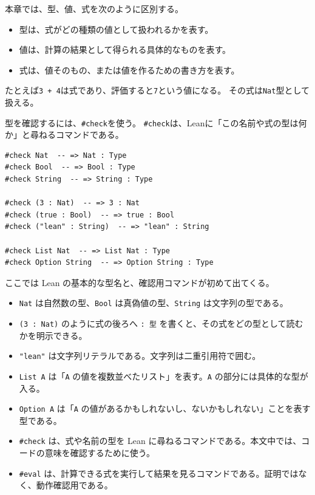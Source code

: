 \begin{definitionbox}
本章では、型、値、式を次のように区別する。

\begin{itemize}
\item 型は、式がどの種類の値として扱われるかを表す。
\item 値は、計算の結果として得られる具体的なものを表す。
\item 式は、値そのもの、または値を作るための書き方を表す。
\end{itemize}

たとえば\texttt{3 + 4}は式であり、評価すると\texttt{7}という値になる。
その式は\texttt{Nat}型として扱える。
\end{definitionbox}

型を確認するには、\texttt{\#check}を使う。
\texttt{\#check}は、Leanに「この名前や式の型は何か」と尋ねるコマンドである。

\begin{listing}[htbp]
\begin{verbatim}
#check Nat  -- => Nat : Type
#check Bool  -- => Bool : Type
#check String  -- => String : Type

#check (3 : Nat)  -- => 3 : Nat
#check (true : Bool)  -- => true : Bool
#check ("lean" : String)  -- => "lean" : String

#check List Nat  -- => List Nat : Type
#check Option String  -- => Option String : Type
\end{verbatim}
\caption{型注釈と型確認}
\label{lst:ch01-type-annotation-check}
\end{listing}

\begin{syntaxbox}
ここでは Lean の基本的な型名と、確認用コマンドが初めて出てくる。
\begin{itemize}
\item \texttt{Nat} は自然数の型、\texttt{Bool} は真偽値の型、\texttt{String} は文字列の型である。
\item \texttt{(3 : Nat)} のように式の後ろへ \texttt{: 型} を書くと、その式をどの型として読むかを明示できる。
\item \texttt{"lean"} は文字列リテラルである。文字列は二重引用符で囲む。
\item \texttt{List A} は「\texttt{A} の値を複数並べたリスト」を表す。\texttt{A} の部分には具体的な型が入る。
\item \texttt{Option A} は「\texttt{A} の値があるかもしれないし、ないかもしれない」ことを表す型である。
\item \texttt{\#check} は、式や名前の型を Lean に尋ねるコマンドである。本文中では、コードの意味を確認するために使う。
\item \texttt{\#eval} は、計算できる式を実行して結果を見るコマンドである。証明ではなく、動作確認用である。
\end{itemize}
\end{syntaxbox}


